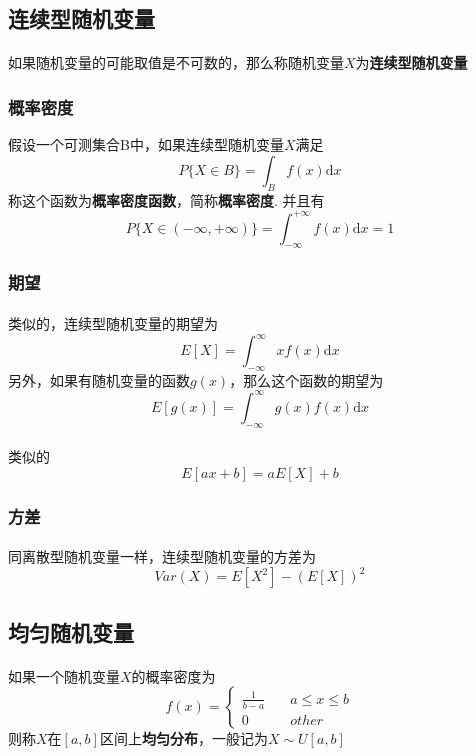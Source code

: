 \subsection{连续型随机变量}
\paragraph{}
如果随机变量的可能取值是不可数的，那么称随机变量$X$为\textbf{连续型随机变量}

\subsubsection{概率密度}
假设一个可测集合B中，如果连续型随机变量$X$满足
$$
P\{X \in B\} = \int_B f(x) \mathrm{d} x
$$
称这个函数为\textbf{概率密度函数}，简称\textbf{概率密度}.
并且有
$$
P\{X \in (-\infty, +\infty)\} = \int_{-\infty}^{+\infty} f(x) \mathrm{d} x = 1
$$

\subsubsection{期望}
\paragraph{}
类似的，连续型随机变量的期望为
$$
E[X] = \int_{-\infty}^{\infty} xf(x) \mathrm{d} x
$$
另外，如果有随机变量的函数$g(x)$，那么这个函数的期望为
$$
E[g(x)] = \int_{-\infty}^\infty g(x) f(x) \mathrm{d} x
$$

\paragraph{}
类似的
$$
E[ax+b] = aE[X] + b
$$

\subsubsection{方差}
\paragraph{}
同离散型随机变量一样，连续型随机变量的方差为
$$
Var(X) = E[X^2] - (E[X])^2
$$

\subsection{均匀随机变量}
\paragraph{}
如果一个随机变量$X$的概率密度为
$$
f(x) = \begin{cases}
\frac{1}{b-a} & \quad a \leq  x \leq b \\
0 &\quad  other
\end{cases}
$$
则称$X$在$[a, b]$区间上\textbf{均匀分布}，一般记为$X \sim U[a, b]$

